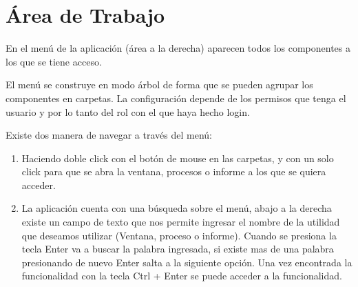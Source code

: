 \documentclass[letterpaper,10pt,spanish]{sphinxmanual}
\begin{document}
\section{Área de Trabajo}
\label{estructura:area-de-trabajo}
En el menú de la aplicación (área a la derecha) aparecen todos los componentes a los que se tiene acceso.

El menú se construye en modo árbol de forma que se pueden agrupar los componentes en carpetas. La configuración depende de los permisos que tenga el usuario y por lo tanto del rol con el que haya hecho login.

Existe dos manera de navegar a través del menú:
\begin{enumerate}
\item {} 
Haciendo doble click con el botón de mouse en las carpetas, y con un solo click para que se abra la ventana, procesos o informe a los que se quiera acceder.

\item {} 
La aplicación cuenta con una búsqueda sobre el menú, abajo a la derecha existe un campo de texto que nos permite ingresar el nombre de la utilidad que deseamos utilizar (Ventana, proceso o informe). Cuando se presiona la tecla Enter va a buscar la palabra ingresada, si existe mas de una palabra presionando de nuevo Enter salta a la siguiente opción. Una vez encontrada la funcionalidad con la tecla Ctrl + Enter se puede acceder a la funcionalidad.

\end{enumerate}
\end{document}
